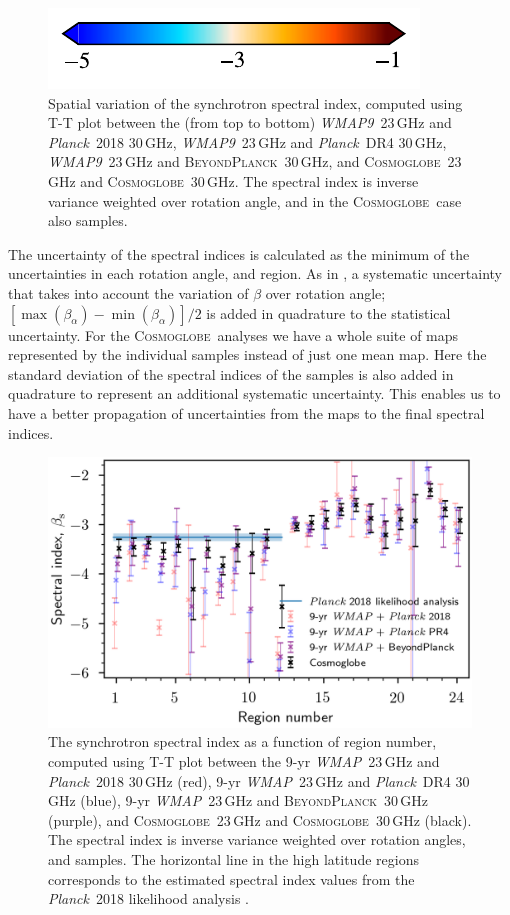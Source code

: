 \documentclass[twocolumn]{../../common/aa}
\def\WMAP{\emph{WMAP}}
\def\WMAPnine{\emph{WMAP9}}
\def\Planck{\emph{Planck}}
\newcommand{\BP}{\textsc{BeyondPlanck}}
\newcommand{\Cosmoglobe}{\textsc{Cosmoglobe}}
\begin{document}
\begin{figure}
	\hspace{0.25cm}\includegraphics{figures/cbar_beta_wide.pdf}
	\caption{Spatial variation of the synchrotron spectral index, computed using T-T plot between the (from top to bottom) \WMAPnine\ 23\,GHz and \Planck\ 2018 30\,GHz, \WMAPnine\ 23\,GHz and \Planck\ DR4 30\,GHz, \WMAPnine\ 23\,GHz and \BP\ 30\,GHz, and \Cosmoglobe\ 23\,GHz and \Cosmoglobe\ 30\,GHz. The spectral index is inverse variance weighted over rotation angle, and in the \Cosmoglobe\ case also samples.}
        \label{fig:TT_beta_maps}
\end{figure}

The uncertainty of the spectral indices is calculated as the minimum of the uncertainties in each rotation angle, and region. As in \citet{fuskeland:2019}, a systematic uncertainty that takes into account the variation of $\beta$ over rotation angle; $[ \max(\beta_\alpha) - \min(\beta_\alpha) ] /2$ is added in quadrature to the statistical uncertainty.
For the \Cosmoglobe\ analyses we have a whole suite of maps represented by the individual samples instead of just one mean map. Here the standard deviation of the spectral indices of the samples is also added in quadrature to represent an additional systematic uncertainty. This enables us to have a better propagation of uncertainties from the maps to the final spectral indices.

\begin{figure}
        \centering
        \includegraphics[width=\linewidth]{figures/cos30_region_beta_cosmoglobe_vs_wmap_all.png}
        \caption{The synchrotron spectral index as a function of region number, computed using T-T plot between the 9-yr \WMAP\ 23\,GHz and \Planck\ 2018 30\,GHz (red), 9-yr \WMAP\ 23\,GHz and \Planck\ DR4 30\,GHz (blue), 9-yr \WMAP\ 23\,GHz and \BP\ 30\,GHz (purple), and \Cosmoglobe\ 23\,GHz and \Cosmoglobe\ 30\,GHz (black). The spectral index is inverse variance weighted over rotation angles, and samples. The horizontal line in the high latitude regions corresponds to the estimated spectral index values from the \Planck\ 2018 likelihood analysis \citep{planck2016-l05}. }
        \label{fig:cos30_beta_region}
\end{figure}
\end{document}
